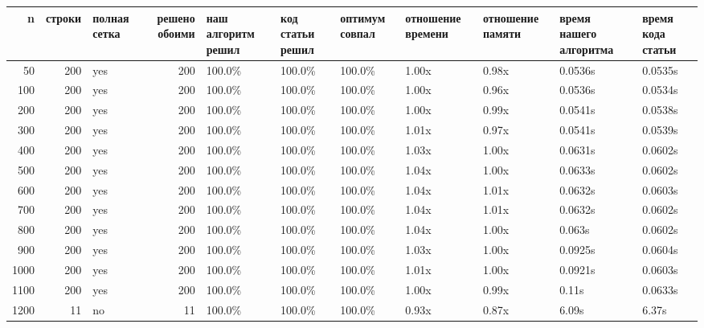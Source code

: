 \begin{tabular}{rrlrlllllll}
\toprule
n & строки & полная сетка & решено обоими & наш алгоритм решил & код статьи решил & оптимум совпал & отношение времени & отношение памяти & время нашего алгоритма & время кода статьи \\
\midrule
50 & 200 & yes & 200 & 100.0\% & 100.0\% & 100.0\% & 1.00x & 0.98x & 0.0536s & 0.0535s \\
100 & 200 & yes & 200 & 100.0\% & 100.0\% & 100.0\% & 1.00x & 0.96x & 0.0536s & 0.0534s \\
200 & 200 & yes & 200 & 100.0\% & 100.0\% & 100.0\% & 1.00x & 0.99x & 0.0541s & 0.0538s \\
300 & 200 & yes & 200 & 100.0\% & 100.0\% & 100.0\% & 1.01x & 0.97x & 0.0541s & 0.0539s \\
400 & 200 & yes & 200 & 100.0\% & 100.0\% & 100.0\% & 1.03x & 1.00x & 0.0631s & 0.0602s \\
500 & 200 & yes & 200 & 100.0\% & 100.0\% & 100.0\% & 1.04x & 1.00x & 0.0633s & 0.0602s \\
600 & 200 & yes & 200 & 100.0\% & 100.0\% & 100.0\% & 1.04x & 1.01x & 0.0632s & 0.0603s \\
700 & 200 & yes & 200 & 100.0\% & 100.0\% & 100.0\% & 1.04x & 1.01x & 0.0632s & 0.0602s \\
800 & 200 & yes & 200 & 100.0\% & 100.0\% & 100.0\% & 1.04x & 1.00x & 0.063s & 0.0602s \\
900 & 200 & yes & 200 & 100.0\% & 100.0\% & 100.0\% & 1.03x & 1.00x & 0.0925s & 0.0604s \\
1000 & 200 & yes & 200 & 100.0\% & 100.0\% & 100.0\% & 1.01x & 1.00x & 0.0921s & 0.0603s \\
1100 & 200 & yes & 200 & 100.0\% & 100.0\% & 100.0\% & 1.00x & 0.99x & 0.11s & 0.0633s \\
1200 & 11 & no & 11 & 100.0\% & 100.0\% & 100.0\% & 0.93x & 0.87x & 6.09s & 6.37s \\
\bottomrule
\end{tabular}
